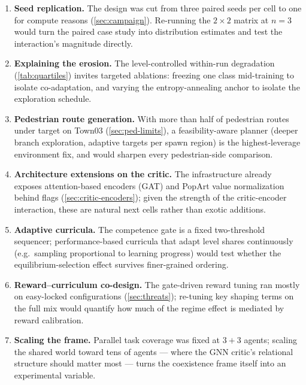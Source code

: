 \begin{enumerate}
  \item \textbf{Seed replication.} The design was cut from three paired
        seeds per cell to one for compute reasons
        (\cref{sec:campaign}). Re-running the $2\times2$ matrix at
        $n{=}3$ would turn the paired case study into distribution
        estimates and test the interaction's magnitude directly.
  \item \textbf{Explaining the erosion.} The level-controlled
        within-run degradation (\cref{tab:quartiles}) invites targeted
        ablations: freezing one class mid-training to isolate
        co-adaptation, and varying the entropy-annealing anchor to
        isolate the exploration schedule.
  \item \textbf{Pedestrian route generation.} With more than half of
        pedestrian routes under target on Town03
        (\cref{sec:ped-limits}), a feasibility-aware planner (deeper
        branch exploration, adaptive targets per spawn region) is the
        highest-leverage environment fix, and would sharpen every
        pedestrian-side comparison.
  \item \textbf{Architecture extensions on the critic.} The
        infrastructure already exposes attention-based encoders (GAT)
        and PopArt value normalization behind flags
        (\cref{sec:critic-encoders}); given the strength of the
        critic-encoder interaction, these are natural next cells rather
        than exotic additions.
  \item \textbf{Adaptive curricula.} The competence gate is a fixed
        two-threshold sequencer; performance-based curricula that adapt
        level shares continuously (e.g.\ sampling proportional to
        learning progress) would test whether the equilibrium-selection
        effect survives finer-grained ordering.
  \item \textbf{Reward--curriculum co-design.} The gate-driven reward
        tuning ran mostly on easy-locked configurations
        (\cref{sec:threats}); re-tuning key shaping terms on the full
        mix would quantify how much of the regime effect is mediated by
        reward calibration.
  \item \textbf{Scaling the frame.} Parallel task coverage was fixed at
        $3{+}3$ agents; scaling the shared world toward tens of agents
        --- where the GNN critic's relational structure should matter
        most --- turns the coexistence frame itself into an experimental
        variable.
\end{enumerate}
